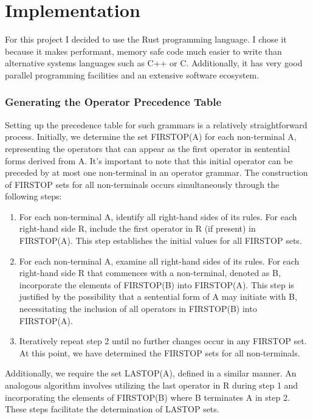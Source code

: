 \chapter{Implementation} \label{implementation}

For this project I decided to use the Rust programming language. I chose
it because it makes performant, memory safe code much easier to write than
alternative systems languages such as C++ or C. Additionally, it has very good
parallel programming facilities and an extensive software ecosystem.

\subsection{Generating the Operator Precedence Table}

Setting up the precedence table for such grammars is a relatively
straightforward process. Initially, we determine the set FIRSTOP(A) for each
non-terminal A, representing the operators that can appear as the first operator
in sentential forms derived from A. It's important to note that this initial
operator can be preceded by at most one non-terminal in an operator grammar. The
construction of FIRSTOP sets for all non-terminals occurs simultaneously through
the following steps:

\begin{enumerate}

	\item For each non-terminal A, identify all right-hand sides of its rules.
	For each right-hand side R, include the first operator in R (if present) in
	FIRSTOP(A). This step establishes the initial values for all FIRSTOP sets.

    \item For each non-terminal A, examine all right-hand sides of its rules.
For each right-hand side R that commences with a non-terminal, denoted as
B, incorporate the elements of FIRSTOP(B) into FIRSTOP(A). This step is
justified by the possibility that a sentential form of A may initiate with B,
necessitating the inclusion of all operators in FIRSTOP(B) into FIRSTOP(A).

    \item Iteratively repeat step 2 until no further changes occur in any
FIRSTOP set. At this point, we have determined the FIRSTOP sets for all
non-terminals.
\end{enumerate}

Additionally, we require the set LASTOP(A), defined in a similar manner. An
analogous algorithm involves utilizing the last operator in R during step 1 and
incorporating the elements of FIRSTOP(B) where B terminates A in step 2. These
steps facilitate the determination of LASTOP sets.

